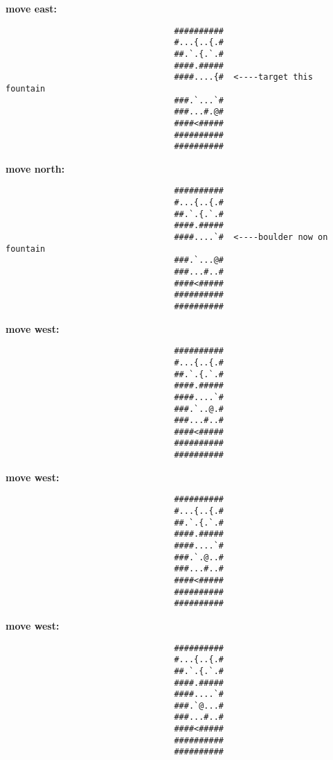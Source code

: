\begin{MyGreenBox}[frametitle={\textbf{Iteration 2 MiniHack Prompt}}]
{\textbf{move east:}
\begin{verbatim}
                                  ##########
                                  #...{..{.#
                                  ##.`.{.`.#
                                  ####.#####
                                  ####....{#  <----target this fountain
                                  ###.`...`#
                                  ###...#.@#
                                  ####<#####
                                  ##########
                                  ##########
\end{verbatim}

\textbf{move north:}
\begin{verbatim}
                                  ##########
                                  #...{..{.#
                                  ##.`.{.`.#
                                  ####.#####
                                  ####....`#  <----boulder now on fountain
                                  ###.`...@#
                                  ###...#..#
                                  ####<#####
                                  ##########
                                  ##########
\end{verbatim}

\textbf{move west:}
\begin{verbatim}
                                  ##########
                                  #...{..{.#
                                  ##.`.{.`.#
                                  ####.#####
                                  ####....`#
                                  ###.`..@.#
                                  ###...#..#
                                  ####<#####
                                  ##########
                                  ##########
\end{verbatim}

\textbf{move west:}
\begin{verbatim}
                                  ##########
                                  #...{..{.#
                                  ##.`.{.`.#
                                  ####.#####
                                  ####....`#
                                  ###.`.@..#
                                  ###...#..#
                                  ####<#####
                                  ##########
                                  ##########
\end{verbatim}

\textbf{move west:}
\begin{verbatim}
                                  ##########
                                  #...{..{.#
                                  ##.`.{.`.#
                                  ####.#####
                                  ####....`#
                                  ###.`@...#
                                  ###...#..#
                                  ####<#####
                                  ##########
                                  ##########
\end{verbatim}

}
\end{MyGreenBox}
